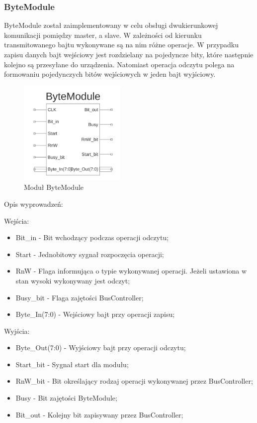 \documentclass[a4paper]{article}
\begin{document}
\subsubsection{ByteModule}

ByteModule został zaimplementowany w celu obsługi dwukierunkowej komunikacji pomiędzy master, a slave. W zależności od kierunku transmitowanego bajtu wykonywane są na nim różne operacje. W przypadku zapisu danych bajt wejściowy jest rozdzielany na pojedyncze bity, które następnie kolejno są przesyłane do urządzenia. Natomiast operacja odczytu polega na formowaniu pojedynczych bitów wejściowych w jeden bajt wyjściowy. 

\begin{figure}[H]
\begin{center}
\includegraphics[height=5cm]{graphics/byte_module_sym.png}
\end{center}
\caption{Moduł ByteModule}
\label{bytemodule_sym}
\end{figure}

Opis wyprowadzeń:

Wejścia:
\begin{itemize}
\item Bit\_in - Bit wchodzący podczas operacji odczytu;
\item Start - Jednobitowy sygnał rozpoczęcia operacji;
\item RnW - Flaga informująca o typie wykonywanej operacji. Jeżeli ustawiona w stan wysoki wykonywany jest odczyt;
\item Busy\_bit - Flaga zajętości BusController;
\item Byte\_In(7:0) - Wejściowy bajt przy operacji zapisu;
\end{itemize}

Wyjścia:
\begin{itemize}
\item Byte\_Out(7:0) - Wyjściowy bajt przy operacji odczytu;
\item Start\_bit - Sygnał start dla modułu;
\item RnW\_bit - Bit określający rodzaj operacji wykonywanej przez BusController;
\item Busy - Bit zajętości ByteModule;
\item Bit\_out - Kolejny bit zapisywany przez BusController;
\end{itemize}
\end{document}
